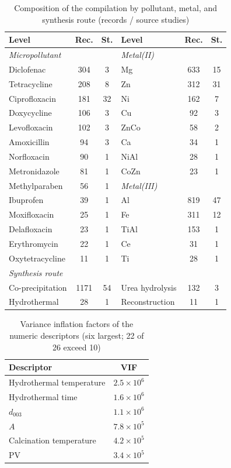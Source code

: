 \documentclass[12pt]{article}
\begin{document}
\begin{table}[h]
\centering
\small
\caption{Composition of the compilation by pollutant, metal, and
synthesis route (records / source studies)}
\begin{tabular}{lcc@{\qquad}lcc}
\toprule
Level & Rec. & St. & Level & Rec. & St. \\
\midrule
\multicolumn{3}{l}{\emph{Micropollutant}} & \multicolumn{3}{l}{\emph{Metal(II)}} \\
Diclofenac & 304 & 3 & Mg & 633 & 15 \\
Tetracycline & 208 & 8 & Zn & 312 & 31 \\
Ciprofloxacin & 181 & 32 & Ni & 162 & 7 \\
Doxycycline & 106 & 3 & Cu & 92 & 3 \\
Levofloxacin & 102 & 3 & ZnCo & 58 & 2 \\
Amoxicillin & 94 & 3 & Ca & 34 & 1 \\
Norfloxacin & 90 & 1 & NiAl & 28 & 1 \\
Metronidazole & 81 & 1 & CoZn & 23 & 1 \\
Methylparaben & 56 & 1 & \multicolumn{3}{l}{\emph{Metal(III)}} \\
Ibuprofen & 39 & 1 & Al & 819 & 47 \\
Moxifloxacin & 25 & 1 & Fe & 311 & 12 \\
Delafloxacin & 23 & 1 & TiAl & 153 & 1 \\
Erythromycin & 22 & 1 & Ce & 31 & 1 \\
Oxytetracycline & 11 & 1 & Ti & 28 & 1 \\
\midrule
\multicolumn{6}{l}{\emph{Synthesis route}} \\
Co-precipitation & 1171 & 54 & Urea hydrolysis & 132 & 3 \\
Hydrothermal & 28 & 1 & Reconstruction & 11 & 1 \\
\bottomrule
\end{tabular}
\end{table}

\begin{table}[h]
\centering
\caption{Variance inflation factors of the numeric descriptors (six
largest; 22 of 26 exceed 10)}
\begin{tabular}{lc}
\toprule
Descriptor & VIF \\
\midrule
Hydrothermal temperature & $2.5 \times 10^{6}$ \\
Hydrothermal time & $1.6 \times 10^{6}$ \\
$d_{003}$ & $1.1 \times 10^{6}$ \\
$A$ & $7.8 \times 10^{5}$ \\
Calcination temperature & $4.2 \times 10^{5}$ \\
PV & $3.4 \times 10^{5}$ \\
\bottomrule
\end{tabular}
\end{table}
\end{document}

